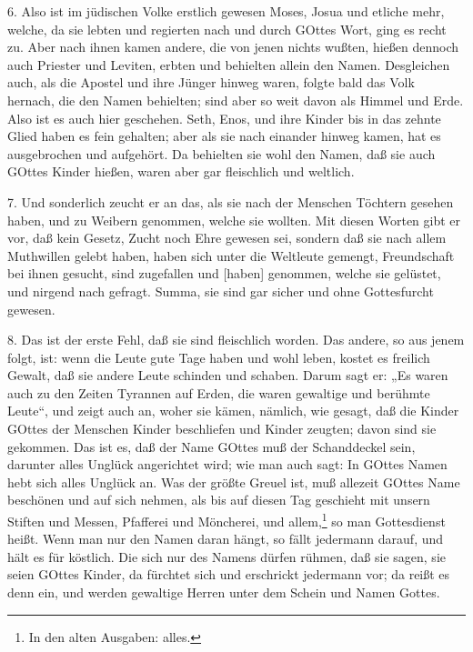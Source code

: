 6. Also ist im jüdischen Volke erstlich gewesen Moses, Josua und etliche mehr, welche, da sie lebten und regierten nach und durch GOttes Wort, ging es recht zu. Aber nach ihnen kamen andere, die von jenen nichts wußten, hießen dennoch auch Priester und Leviten, erbten und behielten allein den Namen. Desgleichen auch, als die Apostel und ihre Jünger hinweg waren, folgte bald das Volk hernach, die den Namen behielten; sind aber so weit davon als Himmel und Erde. Also ist es auch hier geschehen. Seth, Enos, und ihre Kinder bis in das zehnte Glied haben es fein gehalten; aber als sie nach einander hinweg kamen, hat es ausgebrochen und aufgehört. Da behielten sie wohl den Namen, daß sie auch GOttes Kinder hießen, waren aber gar fleischlich und weltlich.

7. Und sonderlich zeucht er an das, als sie nach der Menschen Töchtern gesehen haben, und zu Weibern genommen, welche sie wollten. Mit diesen Worten gibt er vor, daß kein Gesetz, Zucht noch Ehre gewesen sei, sondern daß sie nach allem Muthwillen gelebt haben, haben sich unter die Weltleute gemengt, Freundschaft bei ihnen gesucht, sind zugefallen und [haben] genommen, welche sie gelüstet, und nirgend nach gefragt. Summa, sie sind gar sicher und ohne Gottesfurcht gewesen.

8. Das ist der erste Fehl, daß sie sind fleischlich worden. Das andere, so aus jenem folgt, ist: wenn die Leute gute Tage haben und wohl leben, kostet es freilich Gewalt, daß sie andere Leute schinden und schaben. Darum sagt er: „Es waren auch zu den Zeiten Tyrannen auf Erden, die waren gewaltige und berühmte Leute“, und zeigt auch an, woher sie kämen, nämlich, wie gesagt, daß die Kinder GOttes der Menschen Kinder beschliefen und Kinder zeugten; davon sind sie gekommen. Das ist es, daß der Name GOttes muß der Schanddeckel sein, darunter alles Unglück angerichtet wird; wie man auch sagt: In GOttes Namen hebt sich alles Unglück an. Was der größte Greuel ist, muß allezeit GOttes Name beschönen und auf sich nehmen, als bis auf diesen Tag geschieht mit unsern Stiften und Messen, Pfafferei und Möncherei, und allem,\footnote{In den alten Ausgaben: alles.} so man Gottesdienst heißt. Wenn man nur den Namen daran hängt, so fällt jedermann darauf, und hält es für köstlich. Die sich nur des Namens dürfen rühmen, daß sie sagen, sie seien GOttes Kinder, da fürchtet sich und erschrickt jedermann vor; da reißt es denn ein, und werden gewaltige Herren unter dem Schein und Namen Gottes.

